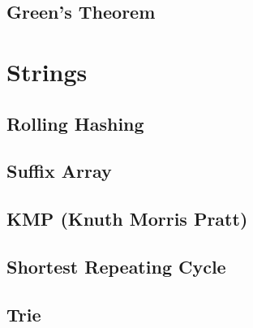 \documentclass[10pt,landscape,twocolumn,a4paper,notitlepage]{article}
\begin{document}
  \subsection{Green's Theorem}
  

\section{Strings}
  \subsection{Rolling Hashing}
  

  \subsection{Suffix Array}
  

  \subsection{KMP (Knuth Morris Pratt)}
  

  \subsection{Shortest Repeating Cycle}
  

  \subsection{Trie}
  
\end{document}
